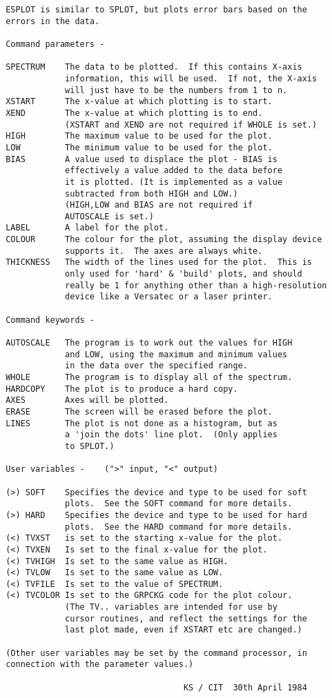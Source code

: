 \begin{description}
\begin{verbatim}
 ESPLOT is similar to SPLOT, but plots error bars based on the
 errors in the data.

 Command parameters -

 SPECTRUM    The data to be plotted.  If this contains X-axis
             information, this will be used.  If not, the X-axis
             will just have to be the numbers from 1 to n.
 XSTART      The x-value at which plotting is to start.
 XEND        The x-value at which plotting is to end.
             (XSTART and XEND are not required if WHOLE is set.)
 HIGH        The maximum value to be used for the plot.
 LOW         The minimum value to be used for the plot.
 BIAS        A value used to displace the plot - BIAS is
             effectively a value added to the data before
             it is plotted. (It is implemented as a value
             subtracted from both HIGH and LOW.)
             (HIGH,LOW and BIAS are not required if
             AUTOSCALE is set.)
 LABEL       A label for the plot.
 COLOUR      The colour for the plot, assuming the display device
             supports it.  The axes are always white.
 THICKNESS   The width of the lines used for the plot.  This is
             only used for 'hard' & 'build' plots, and should
             really be 1 for anything other than a high-resolution
             device like a Versatec or a laser printer.

 Command keywords -

 AUTOSCALE   The program is to work out the values for HIGH
             and LOW, using the maximum and minimum values
             in the data over the specified range.
 WHOLE       The program is to display all of the spectrum.
 HARDCOPY    The plot is to produce a hard copy.
 AXES        Axes will be plotted.
 ERASE       The screen will be erased before the plot.
 LINES       The plot is not done as a histogram, but as
             a 'join the dots' line plot.  (Only applies
             to SPLOT.)

 User variables -    (">" input, "<" output)

 (>) SOFT    Specifies the device and type to be used for soft
             plots.  See the SOFT command for more details.
 (>) HARD    Specifies the device and type to be used for hard
             plots.  See the HARD command for more details.
 (<) TVXST   is set to the starting x-value for the plot.
 (<) TVXEN   Is set to the final x-value for the plot.
 (<) TVHIGH  Is set to the same value as HIGH.
 (<) TVLOW   Is set to the same value as LOW.
 (<) TVFILE  Is set to the value of SPECTRUM.
 (<) TVCOLOR Is set to the GRPCKG code for the plot colour.
             (The TV.. variables are intended for use by
             cursor routines, and reflect the settings for the
             last plot made, even if XSTART etc are changed.)

 (Other user variables may be set by the command processor, in
 connection with the parameter values.)

                                     KS / CIT  30th April 1984
\end{verbatim}
\end{description}
